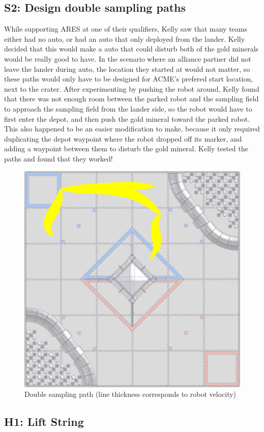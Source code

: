 \documentclass{article}
\begin{document}
\subsection{S2: Design double sampling paths}

While supporting ARES at one of their qualifiers, Kelly saw that many teams either had no auto, or had an auto that only deployed from the lander. Kelly decided that this would make a auto that could disturb both of the gold minerals would be really good to have. In the scenario where an alliance partner did not leave the lander during auto, the location they started at would not matter, so these paths would only have to be designed for ACME's prefered start location, next to the crater. After experimenting by pushing the robot around, Kelly found that there was not enough room between the parked robot and the sampling field to approach the sampling field from the lander side, so the robot would have to first enter the depot, and then push the gold mineral toward the parked robot. This also happened to be an easier modification to make, because it only required duplicating the depot waypoint where the robot dropped off its marker, and adding a waypoint between them to disturb the gold mineral. Kelly tested the paths and found that they worked!

\begin{figure}
    \centering
    \includegraphics[width=.6\textwidth]{22_01-28/images/double.png}
    \caption{Double sampling path (line thickness corresponds to robot velocity)}
    \label{fig:double}
\end{figure}
\subsection{H1: Lift String}
\end{document}
